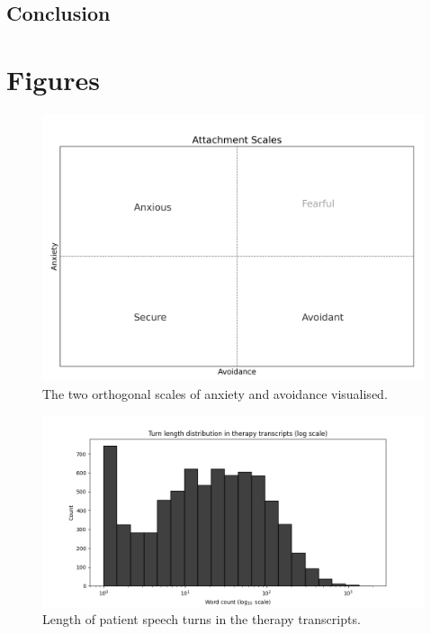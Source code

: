 \documentclass[12pt]{report}
\begin{document}
\section{Conclusion}




\appendix
\chapter{Figures}
\label{App: Figures}

\begin{figure}
    \includegraphics[width=\textwidth]{figures/attachment_scales.png}
    \caption{The two orthogonal scales of anxiety and avoidance visualised.}
    \label{fig: attachment scales}
\end{figure}

\begin{figure}
    \includegraphics[width=\textwidth]{figures/log_turn_length_dist_full.png}
    \caption{Length of patient speech turns in the therapy transcripts.}
    \label{fig: PACS turn length}
\end{figure}
\end{document}
